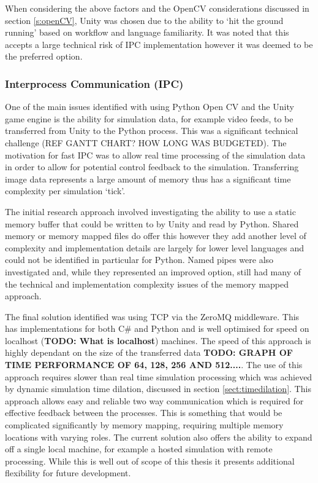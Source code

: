 \documentclass[]{aiaa-tc}%
\begin{document}
When considering the above factors and the OpenCV considerations discussed in section \ref{s:openCV}, Unity was chosen due to the ability to `hit the ground running' based on workflow and language familiarity. It was noted that this accepts a large technical risk of IPC implementation however it was deemed to be the preferred option.

\subsubsection{Interprocess Communication (IPC)} \label{s:IPC}

One of the main issues identified with using Python Open CV and the Unity game engine is the ability for simulation data, for example video feeds, to be transferred from Unity to the Python process. This was a significant technical challenge (REF GANTT CHART? HOW LONG WAS BUDGETED). The motivation for fast IPC was to allow real time processing of the simulation data in order to allow for potential control feedback to the simulation. Transferring image data represents a large amount of memory thus has a significant time complexity per simulation `tick'. 

The initial research approach involved investigating the ability to use a static memory buffer that could be written to by Unity and read by Python. Shared memory or memory mapped files do offer this however they add another level of complexity and implementation details are largely for lower level languages and could not be identified in particular for Python. Named pipes were also investigated and, while they represented an improved option, still had many of the technical and implementation complexity issues of the memory mapped approach.

The final solution identified was using TCP via the ZeroMQ middleware. This has implementations for both C\# and Python and is well optimised for speed on localhost (\textbf{TODO: What is localhost}) machines. The speed of this approach is highly dependant on the size of the transferred data \textbf{TODO: GRAPH OF TIME PERFORMANCE OF 64, 128, 256 AND 512....}. The use of this approach requires slower than real time simulation processing which was achieved by dynamic simulation time dilation, discussed in section \ref{sect:timedilation}. This approach allows easy and reliable two way communication which is required for effective feedback between the processes. This is something that would be complicated significantly by memory mapping, requiring multiple memory locations with varying roles. The current solution also offers the ability to expand off a single local machine, for example a hosted simulation with remote processing. While this is well out of scope of this thesis it presents additional flexibility for future development.
\end{document}
